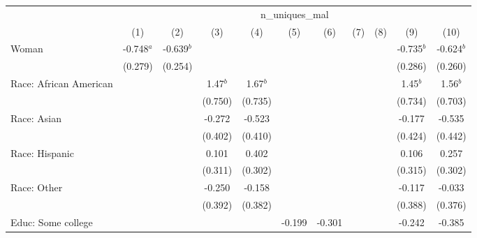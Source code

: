 
\begingroup
\centering
\begin{tabular}{lcccccccccc}
   \toprule
    & \multicolumn{10}{c}{n\_uniques\_mal}\\
                             & (1)          & (2)          & (3)        & (4)         & (5)          & (6)         & (7)         & (8)         & (9)          & (10)\\  
   \midrule 
   Woman                     & -0.748$^{a}$ & -0.639$^{b}$ &            &             &              &             &             &             & -0.735$^{b}$ & -0.624$^{b}$\\   
                             & (0.279)      & (0.254)      &            &             &              &             &             &             & (0.286)      & (0.260)\\   
   Race: African American    &              &              & 1.47$^{b}$ & 1.67$^{b}$  &              &             &             &             & 1.45$^{b}$   & 1.56$^{b}$\\   
                             &              &              & (0.750)    & (0.735)     &              &             &             &             & (0.734)      & (0.703)\\   
   Race: Asian               &              &              & -0.272     & -0.523      &              &             &             &             & -0.177       & -0.535\\   
                             &              &              & (0.402)    & (0.410)     &              &             &             &             & (0.424)      & (0.442)\\   
   Race: Hispanic            &              &              & 0.101      & 0.402       &              &             &             &             & 0.106        & 0.257\\   
                             &              &              & (0.311)    & (0.302)     &              &             &             &             & (0.315)      & (0.302)\\   
   Race: Other               &              &              & -0.250     & -0.158      &              &             &             &             & -0.117       & -0.033\\   
                             &              &              & (0.392)    & (0.382)     &              &             &             &             & (0.388)      & (0.376)\\   
   Educ: Some college        &              &              &            &             & -0.199       & -0.301      &             &             & -0.242       & -0.385\\   

\end{tabular}

